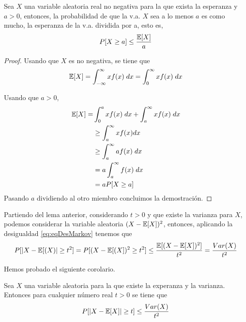     
    
    \begin{lema} \label{lema:DesMarkov}
    Sea $X$ una variable aleatoria real no negativa para la que exista la esperanza y $a>0$, entonces, la probabilidad de que la v.a. $X$ sea a lo menos $a$ es como mucho, la esperanza de la v.a. dividida por a, esto es,
    \begin{equation}\label{eq:eqDesMarkov}
        P[X\geq a] \leq \frac{\mathbb{E}[X]}{a}
    \end{equation}
    \end{lema}
    
        \begin{proof}
        Usando que $X$ es no negativa, se tiene que 
        \begin{equation}
            \mathbb{E}[X] = \int_{-\infty}^{\infty}x f(x) \; dx = \int_{0}^{\infty} xf(x) \; dx
        \end{equation}
        
        \noindent Usando que $a>0$,
        \begin{equation*}
            \begin{aligned}
                \mathbb{E}[X] = & \int_0^a xf(x) \; dx + \int_a^{\infty} xf(x) \; dx \\
                & \geq \int_a^{\infty} xf(x) dx \\
                & \geq \int_a^{\infty} af(x) \; dx \\
                & = a \int_a^{\infty} f(x) \; dx \\
                & = aP[X \geq a]
            \end{aligned}
        \end{equation*}
        Pasando $a$ dividiendo al otro miembro concluimos la demostración.
        \end{proof}
    
    Partiendo del lema anterior, considerando $t>0$ y que existe la varianza para $X$, podemos considerar la variable aleatoria $(X-\mathbb{E}[X])^2$, entonces, aplicando la desigualdad \eqref{eq:eqDesMarkov} tenemos que 
    \begin{equation}
       P[|X-\mathbb{E}[(X)|\geq t^2]  = P[(X-\mathbb{E}[(X])^2 \geq t^2] \leq \frac{\mathbb{E}[(X - \mathbb{E}[X])^2]}{t^2} = \frac{Var(X)}{t^2}
    \end{equation}
    
    \noindent Hemos probado el siguiente corolario.
    
    \begin{corolario}
    Sea $X$ una variable aleatoria para la que existe la experanza y la varianza. Entonces para cualquier número real $t>0$ se tiene que
    \begin{equation}
        P[|X - \mathbb{E}[X]| \geq t] \leq \frac{Var(X)}{t^2}
    \end{equation}
    \end{corolario}
    
